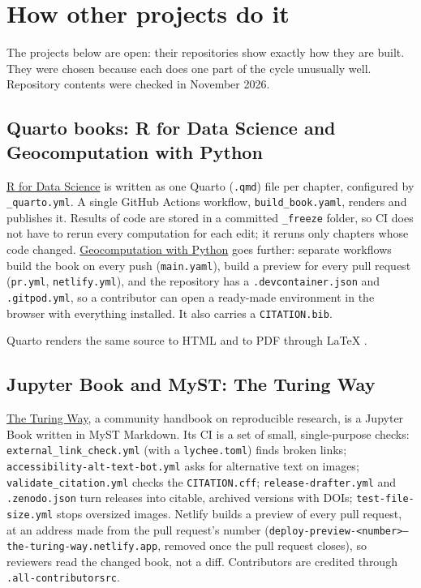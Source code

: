 \chapter{How other projects do it}

The projects below are open: their repositories show exactly how they are built. They were chosen because each does one part of the cycle unusually well. Repository contents were checked in November 2026.

\section{Quarto books: R for Data Science and Geocomputation with Python}

\href{https://github.com/hadley/r4ds}{R for Data Science} is written as one Quarto (\texttt{.qmd}) file per chapter, configured by \texttt{\_quarto.yml}. A single GitHub Actions workflow, \texttt{build\_book.yaml}, renders and publishes it. Results of code are stored in a committed \texttt{\_freeze} folder, so CI does not have to rerun every computation for each edit; it reruns only chapters whose code changed. \href{https://github.com/geocompx/geocompy}{Geocomputation with Python} goes further: separate workflows build the book on every push (\texttt{main.yaml}), build a preview for every pull request (\texttt{pr.yml}, \texttt{netlify.yml}), and the repository has a \texttt{.devcontainer.json} and \texttt{.gitpod.yml}, so a contributor can open a ready-made environment in the browser with everything installed. It also carries a \texttt{CITATION.bib}.

Quarto renders the same source to HTML and to PDF through LaTeX \citep{quartopub}.

\section{Jupyter Book and MyST: The Turing Way}

\href{https://github.com/the-turing-way/the-turing-way}{The Turing Way}, a community handbook on reproducible research, is a Jupyter Book written in MyST Markdown. Its CI is a set of small, single-purpose checks: \texttt{external\_link\_check.yml} (with a \texttt{lychee.toml}) finds broken links; \texttt{accessibility-alt-text-bot.yml} asks for alternative text on images; \texttt{validate\_citation.yml} checks the \texttt{CITATION.cff}; \texttt{release-drafter.yml} and \texttt{.zenodo.json} turn releases into citable, archived versions with DOIs; \texttt{test-file-size.yml} stops oversized images. Netlify builds a preview of every pull request, at an address made from the pull request's number (\texttt{deploy-preview-}\allowbreak\texttt{<number>--the-turing-way.netlify.app}, removed once the pull request closes), so reviewers read the changed book, not a diff. Contributors are credited through \texttt{.all-contributorsrc}.

